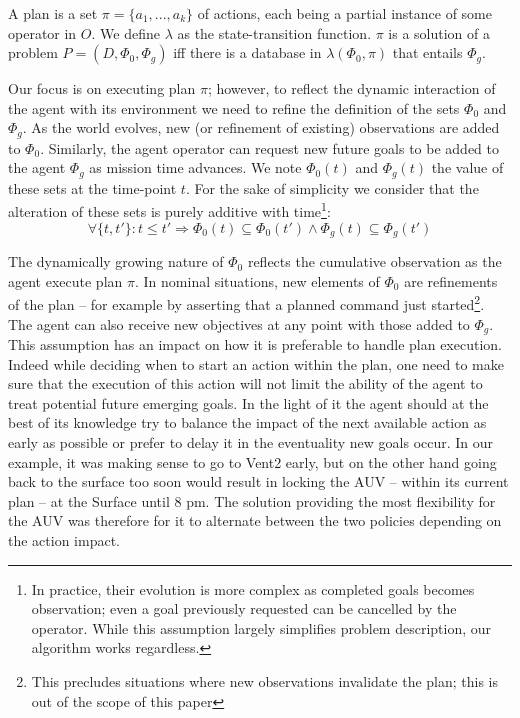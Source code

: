 \begin{definition}
  \label{def:plan}
  A plan is a set $\pi = \{a_1,...,a_k\}$ of actions, each being a
  partial instance of some operator in $O$.  We define $\lambda$ as
  the state-transition function.  $\pi$ is a solution of a problem $P
  = (D, \Phi_0, \Phi_g)$ iff there is a database in $\lambda(\Phi_0,
  \pi)$ that entails $\Phi_g$.
\end{definition}
 
Our focus is on executing plan $\pi$; however, to reflect the dynamic
interaction of the agent with its environment we need to refine the
definition of the sets $\Phi_0$ and $\Phi_g$. As the world evolves,
new (or refinement of existing) observations are added to
$\Phi_0$. Similarly, the agent operator can request new future goals
to be added to the agent $\Phi_g$ as mission time advances. We note
$\Phi_0(t)$ and $\Phi_g(t)$ the value of these sets at the time-point
$t$. For the sake of simplicity we consider that the alteration of
these sets is purely additive with time\footnote{In practice, their
  evolution is more complex as completed goals becomes observation;
  even a goal previously requested can be cancelled by the
  operator. While this assumption largely simplifies problem
  description, our algorithm works regardless.}:
\[ \forall \{t, t'\}: t \le t' \Rightarrow \Phi_0(t) \subseteq \Phi_0(t')
\wedge \Phi_g(t) \subseteq \Phi_g(t') \] 

The dynamically growing nature of $\Phi_0$ reflects the cumulative
observation as the agent execute plan $\pi$. In nominal situations,
new elements of $\Phi_0$ are refinements of the plan -- for example by
asserting that a planned command just started\footnote{This precludes
  situations where new observations invalidate the plan; this is out
  of the scope of this paper}. The agent can also receive new
objectives at any point with those added to $\Phi_g$. This assumption
has an impact on how it is preferable to handle plan execution. Indeed
while deciding when to start an action within the plan, one need to
make sure that the execution of this action will not limit the ability
of the agent to treat potential future emerging goals. In the light of
it the agent should at the best of its knowledge try to balance the
impact of the next available action as early as possible or prefer to
delay it in the eventuality new goals occur. In our example, it was
making sense to go to Vent2 early, but on the other hand going back to
the surface too soon would result in locking the AUV -- within its
current plan -- at the Surface until $8$ pm. The solution providing
the most flexibility for the AUV was therefore for it to alternate
between the two policies depending on the action impact.

